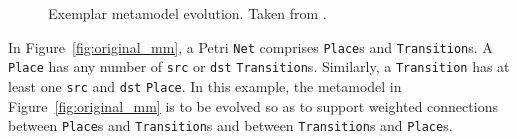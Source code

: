 \begin{figure}[bp]
	\centering
	\caption[Exemplar metamodel evolution (Petri nets)]{Exemplar metamodel evolution. Taken from \cite{rose10flock}.}
\label{fig:petri_nets_mms}
\end{figure}

In Figure~\ref{fig:original_mm}, a Petri \texttt{Net} comprises \texttt{Place}s and \texttt{Transition}s. A \texttt{Place} has any number of \texttt{src} or \texttt{dst} \texttt{Transition}s. Similarly, a \texttt{Transition} has at least one \texttt{src} and \texttt{dst} \texttt{Place}. In this example, the metamodel in Figure~\ref{fig:original_mm} is to be evolved so as to support weighted connections between \texttt{Place}s and \texttt{Transition}s and between \texttt{Transition}s and \texttt{Place}s.

